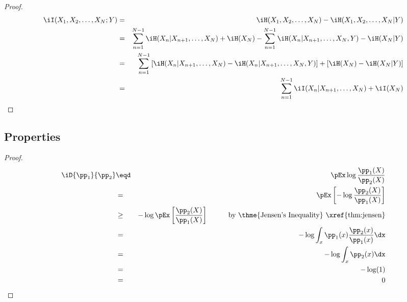 \begin{theorem}
\end{theorem}
\begin{proof}
\begin{eqnarray*}
  \iI(X_1,X_2,\ldots,X_N;Y)
    &=& \iH(X_1,X_2,\ldots,X_N) - \iH(X_1,X_2,\ldots,X_N|Y)
  \\&=& \sum_{n=1}^{N-1}\iH(X_n|X_{n+1},\ldots,X_N) + \iH(X_N) 
        - \sum_{n=1}^{N-1}\iH(X_n|X_{n+1},\ldots,X_N,Y) - \iH(X_N|Y) 
  \\&=& \sum_{n=1}^{N-1}\left[ 
        \iH(X_n|X_{n+1},\ldots,X_N) - \iH(X_n|X_{n+1},\ldots,X_N,Y) 
        \right]
        + \left[ \iH(X_N) - \iH(X_N|Y) \right]
  \\&=& \sum_{n=1}^{N-1}\iI(X_n|X_{n+1},\ldots,X_N) 
        + \iI(X_N) 
\end{eqnarray*}
\end{proof}

\subsection{Properties}
\begin{theorem}
\end{theorem}
\begin{proof}
\begin{eqnarray*}
  \iD{\pp_1}{\pp_2}
    &\eqd& \pEx\log\frac{\pp_1(X)}{\pp_2(X)}
  \\&=&    \pEx\left[-\log\frac{\pp_2(X)}{\pp_1(X)} \right]
  \\&\ge&  -\log\pEx\left[\frac{\pp_2(X)}{\pp_1(X)} \right]
    \hspace{1cm}\mbox{by \thme{Jensen's Inequality} \xref{thm:jensen}}
  \\&=&    -\log\int_x \pp_1(x)\frac{\pp_2(x)}{\pp_1(x)} \dx
  \\&=&    -\log\int_x \pp_2(x) \dx
  \\&=&    -\log(1)
  \\&=&    0
\end{eqnarray*}
\end{proof}
